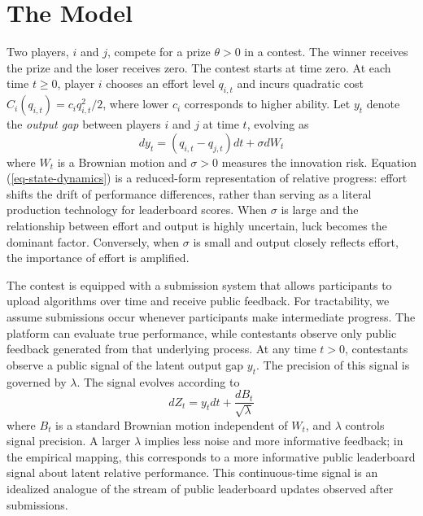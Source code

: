 \documentclass[mnsc]{informs3}
\begin{document}
\section{The Model}\label{contest-theory}

Two players, $i$ and $j$, compete for a prize $\theta>0$ in a contest.
The winner receives the prize and the loser receives zero.
The contest starts at time zero.
At each time $t\ge0$, player $i$ chooses an effort level $q_{i,t}$ and incurs quadratic cost $C_i(q_{i,t}) = c_i q_{i,t}^2/2$, where lower $c_i$ corresponds to higher ability.
Let $y_t$ denote the \textit{output gap} between players $i$ and $j$ at time $t$, evolving as
\begin{equation}\label{eq-state-dynamics}
	dy_t = (q_{i,t}-q_{j,t})dt + \sigma dW_t
\end{equation}
where $W_t$ is a Brownian motion and $\sigma>0$ measures the innovation risk.
Equation (\ref{eq-state-dynamics}) is a reduced-form representation of relative progress: effort shifts the drift of performance differences, rather than serving as a literal production technology for leaderboard scores.
When $\sigma$ is large and the relationship between effort and output is highly uncertain, luck becomes the dominant factor.
Conversely, when $\sigma$ is small and output closely reflects effort, the importance of effort is amplified.

The contest is equipped with a submission system that allows participants to upload algorithms over time and receive public feedback.
For tractability, we assume submissions occur whenever participants make intermediate progress.
The platform can evaluate true performance, while contestants observe only public feedback generated from that underlying process.
At any time $t>0$, contestants observe a public signal of the latent output gap $y_t$.
The precision of this signal is governed by $\lambda$.
The signal evolves according to
\begin{equation}\label{signal}
	dZ_{t} = y_{t}dt + \frac{dB_{t}}{\sqrt{\lambda}}
\end{equation}
where $B_{t}$ is a standard Brownian motion independent of $W_t$, and $\lambda$ controls signal precision.
A larger $\lambda$ implies less noise and more informative feedback; in the empirical mapping, this corresponds to a more informative public leaderboard signal about latent relative performance.
This continuous-time signal is an idealized analogue of the stream of public leaderboard updates observed after submissions.
\end{document}
